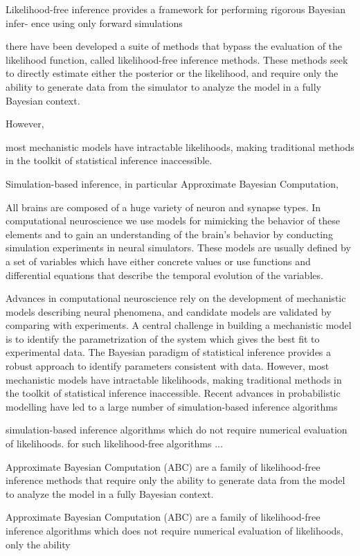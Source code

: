Likelihood-free inference provides a framework for performing rigorous Bayesian infer- ence using only forward simulations

there have been developed a suite of methods that bypass the evaluation of the likelihood function, called likelihood-free inference methods. These methods seek to directly estimate either the posterior or the likelihood, and require only the ability to generate data from the simulator to analyze the model in a fully Bayesian context.


However, 

most mechanistic models have intractable likelihoods, making traditional methods in the toolkit of statistical inference inaccessible.

Simulation-based inference, in particular Approximate Bayesian Computation,


All brains are composed of a huge variety of neuron and synapse types. In computational neuroscience we use models for mimicking the behavior of these elements and to gain an understanding of the brain's behavior by conducting simulation experiments in neural simulators. These models are usually defined by a set of variables which have either concrete values or use functions and differential equations that describe the temporal evolution of the variables.

Advances in computational neuroscience rely on the development of mechanistic models describing neural phenomena, and candidate models are validated by comparing with experiments. A central challenge in building a mechanistic model is to identify the parametrization of the system which gives the best fit to experimental data. The Bayesian paradigm of statistical inference provides a robust approach to identify parameters consistent with data. However, most mechanistic models have intractable likelihoods, making traditional methods in the toolkit of statistical inference inaccessible. Recent advances in probabilistic modelling have led to a large number of simulation-based inference algorithms 

 simulation-based inference algorithms which do not require numerical evaluation of likelihoods. for such likelihood-free algorithms ...

Approximate Bayesian Computation (ABC) are a family of likelihood-free inference methods that require only the ability to generate data from the model to analyze the model in a fully Bayesian context.

Approximate Bayesian Computation (ABC) are a family of likelihood-free inference algorithms which does not require numerical evaluation of likelihoods, only the ability 

